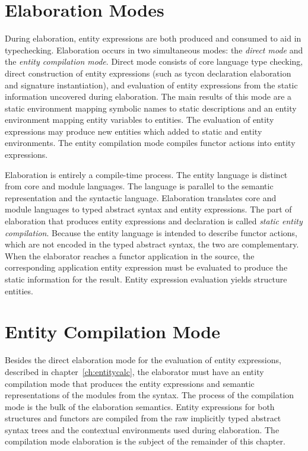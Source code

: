 \documentclass[9pt,nocopyrightspace, fleqn]{sigplanconf}
\begin{document}
\section{Elaboration Modes}
During elaboration, entity expressions are both produced and consumed to aid in typechecking. Elaboration occurs in two simultaneous modes: the \emph{direct mode} and the \emph{entity compilation mode}. Direct mode consists of core language type checking, direct construction of entity expressions (such as tycon declaration elaboration and signature instantiation), and evaluation of entity expressions from the static information uncovered during elaboration. The main results of this mode are a static environment mapping symbolic names to static descriptions and an entity environment mapping entity variables to entities. The evaluation of entity expressions may produce new entities which added to static and entity environments. The entity compilation mode compiles functor actions into entity expressions.   

Elaboration is entirely a compile-time process. The entity language is distinct from core and module languages. The language is parallel to the semantic representation and the syntactic language. Elaboration translates core and module languages to typed abstract syntax and entity expressions. The part of elaboration that produces entity expressions and declaration is called \emph{static entity compilation}. Because the entity language is intended to describe functor actions, which are not encoded in the typed abstract syntax, the two are complementary. When the elaborator reaches a functor application in the source, the corresponding application entity expression must be evaluated to produce the static information for the result. Entity expression evaluation yields structure entities. 
   
\section{Entity Compilation Mode}
Besides the direct elaboration mode for the evaluation of entity expressions, described in chapter~\ref{ch:entitycalc}, the elaborator must have an entity compilation mode that produces the entity expressions and semantic representations of the modules from the syntax. The process of the compilation mode is the bulk of the elaboration semantics. Entity expressions for both structures and functors are compiled from the raw implicitly typed abstract syntax trees and the contextual environments used during elaboration. The compilation mode elaboration is the subject of the remainder of this chapter. 
\end{document}
